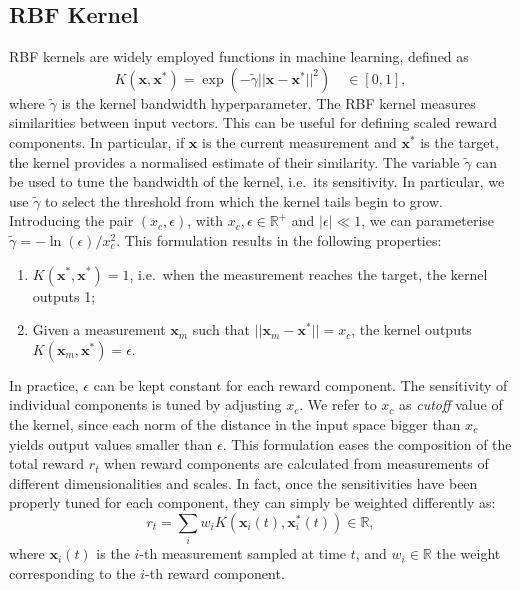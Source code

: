 \subsection{RBF Kernel}

\ac{RBF} kernels are widely employed functions in machine learning, defined as
$$
K(\mathbf{x}, \mathbf{x}^*) = \exp \left( -\tilde\gamma ||\mathbf{x} - \mathbf{x}^*||^2  \right) \quad \in [0, 1] ,
$$
where $\tilde\gamma$ is the kernel bandwidth hyperparameter.
The \ac{RBF} kernel measures similarities between input vectors.
This can be useful for defining scaled reward components.
In particular, if $\mathbf{x}$ is the current measurement and $\mathbf{x}^*$ is the target, the kernel provides a normalised estimate of their similarity.
The variable $\tilde\gamma$ can be used to tune the bandwidth of the kernel, i.e.\ its sensitivity.
In particular, we use $\tilde\gamma$ to select the threshold from which the kernel tails begin to grow.
Introducing the pair $(x_c, \epsilon)$, with $x_c, \epsilon \in \mathbb{R}^+$ and $|\epsilon| \ll 1$, we can parameterise $\tilde\gamma = -\ln(\epsilon) / x_c^2$.
This formulation results in the following properties:

\begin{enumerate}
    \item $K(\mathbf{x}^*, \mathbf{x}^*) = 1$, i.e.\ when the measurement reaches the target, the kernel outputs 1;
    \item Given a measurement $\mathbf{x}_m$ such that $||\mathbf{x}_m - \mathbf{x}^*|| = x_c$, the kernel outputs $K(\mathbf{x}_m, \mathbf{x}^*) = \epsilon$.
\end{enumerate}

\noindent
In practice, $\epsilon$ can be kept constant for each reward component.
The sensitivity of individual components is tuned by adjusting $x_c$.
We refer to $x_c$ as \emph{cutoff} value of the kernel, since each norm of the distance in the input space bigger than $x_c$ yields output values smaller than $\epsilon$.
This formulation eases the composition of the total reward $r_t$ when reward components are calculated from measurements of different dimensionalities and scales.
In fact, once the sensitivities have been properly tuned for each component, they can simply be weighted differently as:
%
\begin{equation}
    \label{eq:weighted_reward_kernel}
    r_t = \sum_i w_i K \left( \mathbf{x}_i(t), \mathbf{x}_i^*(t) \right) \in \mathbb{R}
    ,
\end{equation}
%
where $\mathbf{x}_{i}(t)$ is the $i$-th measurement sampled at time $t$, and $w_i \in \mathbb{R}$ the weight corresponding to the $i$-th reward component.

